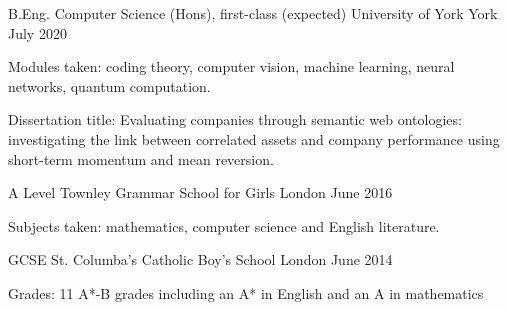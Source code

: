
\begin{cventries}
  \cventry
    {B.Eng. Computer Science (Hons), first-class (expected)} %
    {University of York} %
    {York} %
    {July 2020} %
    {
      \begin{cvitems} %
         \item {Modules taken: coding theory, computer vision, machine learning, neural networks, quantum computation.}
         \vspace{0.5mm}
         \item {Dissertation title: Evaluating companies through semantic web ontologies: investigating the link between correlated assets and company performance using short-term momentum and mean reversion.}
      \end{cvitems}
    }

  \cventry
    {A Level} %
    {Townley Grammar School for Girls} %
    {London} %
    {June 2016} %
    {
      \begin{cvitems} %
      \item {Subjects taken: mathematics, computer science and English literature.}
      \end{cvitems}
    }

  \cventry
    {GCSE} %
    {St. Columba’s Catholic Boy’s School} %
    {London} %
    {June 2014} %
    {
      \begin{cvitems} %
      \item {Grades: 11 A*-B grades including an A* in English and an A in mathematics}
      \end{cvitems}
    }
\end{cventries}
